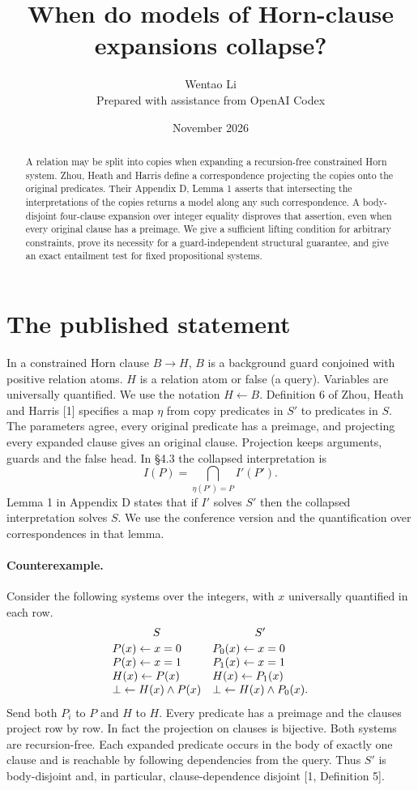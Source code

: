 \documentclass[11pt]{article}
\title{When do models of Horn-clause expansions collapse?}
\author{Wentao Li\\[2pt]\small Prepared with assistance from OpenAI Codex}
\date{November 2026}
\begin{document}
\maketitle
\begin{abstract}
A relation may be split into copies when expanding a recursion-free constrained Horn system. Zhou, Heath and Harris define a correspondence projecting the copies onto the original predicates. Their Appendix D, Lemma 1 asserts that intersecting the interpretations of the copies returns a model along any such correspondence. A body-disjoint four-clause expansion over integer equality disproves that assertion, even when every original clause has a preimage. We give a sufficient lifting condition for arbitrary constraints, prove its necessity for a guard-independent structural guarantee, and give an exact entailment test for fixed propositional systems.
\end{abstract}

\section{The published statement}
In a constrained Horn clause $B\to H$, $B$ is a background guard conjoined with positive relation atoms. $H$ is a relation atom or false (a query). Variables are universally quantified. We use the notation $H\leftarrow B$. Definition 6 of Zhou, Heath and Harris [1] specifies a map $\eta$ from copy predicates in $S'$ to predicates in $S$. The parameters agree, every original predicate has a preimage, and projecting every expanded clause gives an original clause. Projection keeps arguments, guards and the false head. In \S4.3 the collapsed interpretation is
\[
       I(P)=\bigcap_{\eta(P')=P} I'(P').
\]
Lemma 1 in Appendix D states that if $I'$ solves $S'$ then the collapsed interpretation solves $S$. We use the conference version and the quantification over correspondences in that lemma.

\paragraph{Counterexample.} Consider the following systems over the integers, with $x$ universally quantified in each row.
\[
\begin{array}{ll}
 \multicolumn{1}{c}{S} & \multicolumn{1}{c}{S'}\\[2pt]
 P(x)\leftarrow x=0               &P_0(x)\leftarrow x=0\\
 P(x)\leftarrow x=1               &P_1(x)\leftarrow x=1\\
 H(x)\leftarrow P(x)              &H(x)\leftarrow P_1(x)\\
 \bot\leftarrow H(x)\land P(x)    &\bot\leftarrow H(x)\land P_0(x).
\end{array}
\]
Send both $P_i$ to $P$ and $H$ to $H$. Every predicate has a preimage and the clauses project row by row. In fact the projection on clauses is bijective. Both systems are recursion-free. Each expanded predicate occurs in the body of exactly one clause and is reachable by following dependencies from the query. Thus $S'$ is body-disjoint and, in particular, clause-dependence disjoint [1, Definition 5].
\end{document}
